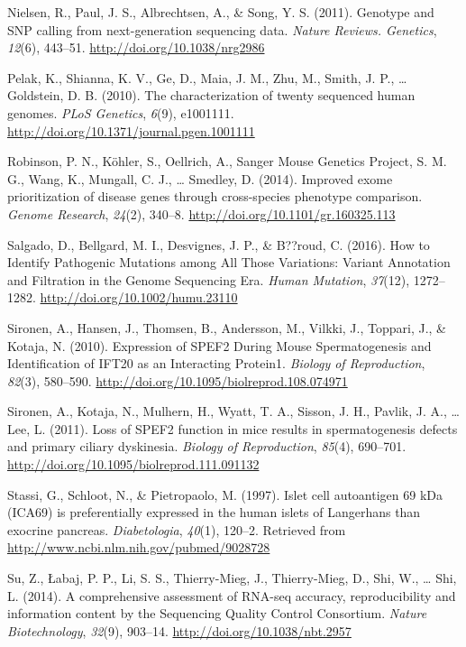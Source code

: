 \documentclass[12pt,twoside]{reedthesis}
\theoremstyle{definition}
\theoremstyle{definition}
\theoremstyle{remark}
\begin{document}
  \hypertarget{ref-Nielsen2011}{}
  Nielsen, R., Paul, J. S., Albrechtsen, A., \& Song, Y. S. (2011).
  Genotype and SNP calling from next-generation sequencing data.
  \emph{Nature Reviews. Genetics}, \emph{12}(6), 443--51.
  \url{http://doi.org/10.1038/nrg2986}
  
  \hypertarget{ref-Pelak2010}{}
  Pelak, K., Shianna, K. V., Ge, D., Maia, J. M., Zhu, M., Smith, J. P.,
  \ldots{} Goldstein, D. B. (2010). The characterization of twenty
  sequenced human genomes. \emph{PLoS Genetics}, \emph{6}(9), e1001111.
  \url{http://doi.org/10.1371/journal.pgen.1001111}
  
  \hypertarget{ref-Robinson2014}{}
  Robinson, P. N., Köhler, S., Oellrich, A., Sanger Mouse Genetics
  Project, S. M. G., Wang, K., Mungall, C. J., \ldots{} Smedley, D.
  (2014). Improved exome prioritization of disease genes through
  cross-species phenotype comparison. \emph{Genome Research},
  \emph{24}(2), 340--8. \url{http://doi.org/10.1101/gr.160325.113}
  
  \hypertarget{ref-Salgado2016}{}
  Salgado, D., Bellgard, M. I., Desvignes, J. P., \& B??roud, C. (2016).
  How to Identify Pathogenic Mutations among All Those Variations: Variant
  Annotation and Filtration in the Genome Sequencing Era. \emph{Human
  Mutation}, \emph{37}(12), 1272--1282.
  \url{http://doi.org/10.1002/humu.23110}
  
  \hypertarget{ref-Sironen2010}{}
  Sironen, A., Hansen, J., Thomsen, B., Andersson, M., Vilkki, J.,
  Toppari, J., \& Kotaja, N. (2010). Expression of SPEF2 During Mouse
  Spermatogenesis and Identification of IFT20 as an Interacting Protein1.
  \emph{Biology of Reproduction}, \emph{82}(3), 580--590.
  \url{http://doi.org/10.1095/biolreprod.108.074971}
  
  \hypertarget{ref-Sironen2011}{}
  Sironen, A., Kotaja, N., Mulhern, H., Wyatt, T. A., Sisson, J. H.,
  Pavlik, J. A., \ldots{} Lee, L. (2011). Loss of SPEF2 function in mice
  results in spermatogenesis defects and primary ciliary dyskinesia.
  \emph{Biology of Reproduction}, \emph{85}(4), 690--701.
  \url{http://doi.org/10.1095/biolreprod.111.091132}
  
  \hypertarget{ref-Stassi1997}{}
  Stassi, G., Schloot, N., \& Pietropaolo, M. (1997). Islet cell
  autoantigen 69 kDa (ICA69) is preferentially expressed in the human
  islets of Langerhans than exocrine pancreas. \emph{Diabetologia},
  \emph{40}(1), 120--2. Retrieved from
  \url{http://www.ncbi.nlm.nih.gov/pubmed/9028728}
  
  \hypertarget{ref-Su2014}{}
  Su, Z., Łabaj, P. P., Li, S. S., Thierry-Mieg, J., Thierry-Mieg, D.,
  Shi, W., \ldots{} Shi, L. (2014). A comprehensive assessment of RNA-seq
  accuracy, reproducibility and information content by the Sequencing
  Quality Control Consortium. \emph{Nature Biotechnology}, \emph{32}(9),
  903--14. \url{http://doi.org/10.1038/nbt.2957}
  
\end{document}
